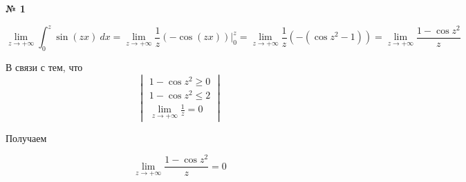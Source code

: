 \documentclass{article}
\begin{document}
\textbf{№ 1} 
\large

$$ \lim\limits_{z \to +\infty} \int_{0}^{z} \sin{(zx)} \ dx
= \lim\limits_{z \to +\infty} \frac{1}{z} \left( -\cos{(zx)} \right) \bigg\vert_{0}^{z}
= \lim\limits_{z \to +\infty} \frac{1}{z} \left( -(\cos{z^2} - 1) \right) 
= \lim\limits_{z \to +\infty} \frac{1 - \cos{z^2}}{z} $$  

В связи с тем, что
$$ \begin{vmatrix}
        1 - \cos{z^2} \geq 0 \\
        1 - \cos{z^2} \leq 2 \\
        \lim\limits_{z \to +\infty} \frac{1}{z} = 0 
   \end{vmatrix} $$

Получаем

$$ \lim\limits_{z \to +\infty} \frac{1 - \cos{z^2}}{z}
= 0 $$
\end{document}
